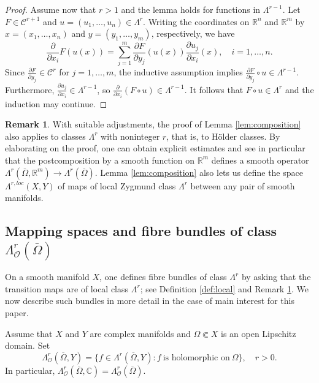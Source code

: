 \documentclass[11pt]{amsart}
\numberwithin{equation}{section}
\theoremstyle{definition}
\newtheorem{remark}[theorem]{Remark}
\newcommand\Cscr{\mathscr{C}}
\newcommand\Oscr{\mathscr{O}}
\newcommand\C{\mathbb{C}}
\newcommand\R{\mathbb{R}}
\newcommand\di{\partial}
\begin{document}
\begin{proof}
Assume now that $r>1$ and the lemma holds for functions in $\Lambda^{r-1}$.
Let $F\in \Cscr^{r+1}$ and $u=(u_1,\ldots,u_n)\in \Lambda^{r}$.
Writing the coordinates on $\R^n$ and $\R^m$ 
by $x=(x_1,\ldots,x_n)$ and $y=(y_1,\ldots,y_m)$, respectively, we have
\[
	\frac{\di}{\di x_i} F(u(x)) = 
	\sum_{j=1}^m \frac{\di F}{\di y_j}(u(x)) \frac{\di u_j}{\di x_i}(x),
	\quad i=1,\ldots,n.
\]
Since $\frac{\di F}{\di y_j}\in \Cscr^{r}$ for 
$j=1,\ldots,m$, the inductive assumption implies 
$\frac{\di F}{\di y_j}\circ u \in \Lambda^{r-1}$.
Furthermore, $\frac{\di u_j}{\di x_i}\in \Lambda^{r-1}$,
so $\frac{\di}{\di x_i} (F\circ u) \in \Lambda^{r-1}$.
It follows that $F\circ u\in \Lambda^{r}$ and the induction may continue.
\end{proof}


 \begin{remark}\label{rem:composition}
 With suitable adjustments, the proof of Lemma \ref{lem:composition}
 also applies to classes $\Lambda^r$ with noninteger $r$,
 that is, to H\"older classes. By elaborating on the proof, one can 
 obtain explicit estimates and see in particular that the postcomposition 
 by a smooth function on $\R^m$ defines a smooth operator 
 $\Lambda^r(\overline \Omega,\R^m)\to \Lambda^r(\overline \Omega)$. 
Lemma \ref{lem:composition} also lets us define the space 
 $\Lambda^{r,loc}(X,Y)$ of maps of local Zygmund class $\Lambda^r$
 between any pair of smooth manifolds.
 \end{remark}

%
%
\subsection{Mapping spaces and fibre bundles of class 
$\Lambda^r_\Oscr(\overline\Omega)$} \label{ss:Lr-bundles}

On a smooth manifold $X$, one defines fibre bundles of class
$\Lambda^r$ by asking that the transition maps are
of local class $\Lambda^r$; see Definition \ref{def:local}
and Remark \ref{rem:composition}.
We now describe such bundles in more detail in 
the case of main interest for this paper. 

Assume that $X$ and $Y$ are complex manifolds and 
$\Omega\Subset X$ is an open Lipschitz domain. Set
\[
	\Lambda^r_\Oscr(\overline\Omega,Y)=
	\{f\in \Lambda^r(\overline\Omega,Y): 
	f\ \text{is holomorphic on}\ \Omega\},\quad r>0.
\]
In particular, 
$\Lambda^r_\Oscr(\overline\Omega,\C) =\Lambda^r_\Oscr(\overline\Omega)$.
\end{document}
